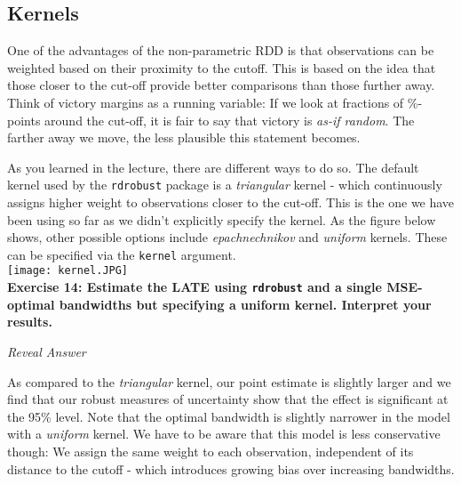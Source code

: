 \documentclass[
  letterpaper,
  DIV=11,
  numbers=noendperiod]{scrreprt}
\newenvironment{Shaded}{\begin{snugshade}}{\end{snugshade}}
\newcommand{\AttributeTok}[1]{\textcolor[rgb]{0.40,0.45,0.13}{#1}}
\newcommand{\DecValTok}[1]{\textcolor[rgb]{0.68,0.00,0.00}{#1}}
\newcommand{\FunctionTok}[1]{\textcolor[rgb]{0.28,0.35,0.67}{#1}}
\newcommand{\NormalTok}[1]{\textcolor[rgb]{0.00,0.23,0.31}{#1}}
\newcommand{\OtherTok}[1]{\textcolor[rgb]{0.00,0.23,0.31}{#1}}
\newcommand{\SpecialCharTok}[1]{\textcolor[rgb]{0.37,0.37,0.37}{#1}}
\newcommand{\StringTok}[1]{\textcolor[rgb]{0.13,0.47,0.30}{#1}}
\begin{document}
\hypertarget{kernels}{%
\subsection{Kernels}\label{kernels}}

One of the advantages of the non-parametric RDD is that observations can
be weighted based on their proximity to the cutoff. This is based on the
idea that those closer to the cut-off provide better comparisons than
those further away. Think of victory margins as a running variable: If
we look at fractions of \%-points around the cut-off, it is fair to say
that victory is \emph{as-if random}. The farther away we move, the less
plausible this statement becomes.

As you learned in the lecture, there are different ways to do so. The
default kernel used by the \texttt{rdrobust} package is a
\emph{triangular} kernel - which continuously assigns higher weight to
observations closer to the cut-off. This is the one we have been using
so far as we didn't explicitly specify the kernel. As the figure below
shows, other possible options include \emph{epachnechnikov} and
\emph{uniform} kernels. These can be specified via the \texttt{kernel}
argument.\\

\texttt{[image: kernel.JPG]}\\

\textbf{Exercise 14: Estimate the LATE using \texttt{rdrobust} and a
single MSE-optimal bandwidths but specifying a uniform kernel. Interpret
your results.}

\emph{Reveal Answer}

\begin{Shaded}
\end{Shaded}

As compared to the \emph{triangular} kernel, our point estimate is
slightly larger and we find that our robust measures of uncertainty show
that the effect is significant at the 95\% level. Note that the optimal
bandwidth is slightly narrower in the model with a \emph{uniform}
kernel. We have to be aware that this model is less conservative though:
We assign the same weight to each observation, independent of its
distance to the cutoff - which introduces growing bias over increasing
bandwidths.
\end{document}
